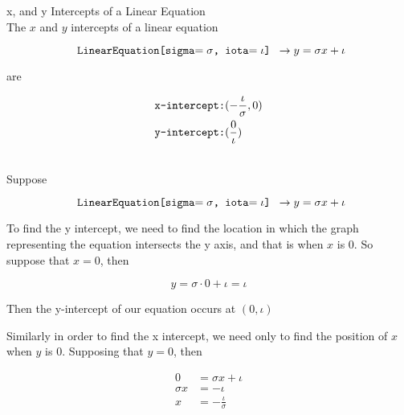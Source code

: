 \documentclass{book}
\begin{document}
  {\theorem x, and y Intercepts of a Linear Equation \\
    The $x$ and $y$ intercepts of a linear equation

    $$\text{\texttt{ LinearEquation[sigma$= {\sigma}$, iota$= {\iota}$] }}\to y = {\sigma}x + {\iota}$$

    are

    \begin{align*}
      & \text{\texttt{x-intercept:}}(-\frac{\iota}{\sigma}, 0)\\
      & \text{\texttt{y-intercept:}}(\frac{0}{\iota})
    \end{align*}

    \proof\\

    Suppose

    $$\text{\texttt{ LinearEquation[sigma$= {\sigma}$, iota$= {\iota}$] }}\to y = {\sigma}x + {\iota}$$

    To find the y intercept, we need to find the location in which the graph representing the equation intersects the y axis, and that is when $x$ is $0$. So suppose that $x = 0$, then

    $$y = \sigma \cdot 0 + \iota = \iota$$

    Then the y-intercept of our equation occurs at $(0, \iota)$

    Similarly in order to find the x intercept, we need only to find the position of $x$ when $y$ is $0$. Supposing that $y = 0$, then

    \begin{align*}
      0 & = \sigma x + \iota\\
      \sigma x & = -\iota\\
      x & = -\frac{\iota}{\sigma}
    \end{align*}
  }
\end{document}
